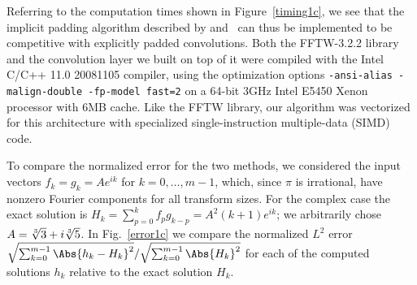 \documentclass[final]{siamltex}
\begin{document}
Referring to the computation times shown in Figure~\ref{timing1c},
we see that the implicit padding algorithm described by  
and~
can thus be implemented to be competitive with explicitly padded
convolutions. Both the FFTW-3.2.2 library and the convolution layer we built on
top of it were compiled with the Intel C/C++ 11.0 20081105 compiler, using
the optimization options {\tt -ansi-alias -malign-double -fp-model fast=2}
on a 64-bit 3GHz Intel E5450 Xenon processor with 6MB cache. Like the FFTW
library, our algorithm was vectorized for this architecture with
specialized single-instruction multiple-data (SIMD) code.

To compare the normalized error for the two methods, we considered the
input vectors $f_k=g_k=A e^{ik}$ for $k=0,\ldots,m-1$, which, since $\pi$ is
irrational, have nonzero Fourier components for all transform sizes.
For the complex case the exact solution is $H_k=\sum_{p=0}^k f_p
g_{k-p}=A^2 (k+1) e^{ik}$; we arbitrarily chose $A=\root3\of3+ i\root3\of 5$.
In Fig.~\ref{error1c} we compare the normalized $L^2$ error 
$\sqrt{\sum_{k=0}^{m-1}\Abs{h_k-H_k}^2}/\sqrt{\sum_{k=0}^{m-1} \Abs{H_k}^2}$
for each of the computed solutions $h_k$ relative to the exact solution $H_k$.

\setlength{\algomargin}{0.6em}
\SetAlCapSkip{3pt}
\def\fft{{\tt fft}}
\def\crfft{{\tt crfft}}
\def\rcfft{{\tt rcfft}}
\def\fftOpadBackwards{{\tt fft0padBackwards}}
\def\fftOpadForwards{{\tt fft0padForwards}}
\def\fftObipadBackwards{{\tt fft0bipadBackwards}}
\def\fftObipadForwards{{\tt fft0bipadForwards}}
\end{document}

